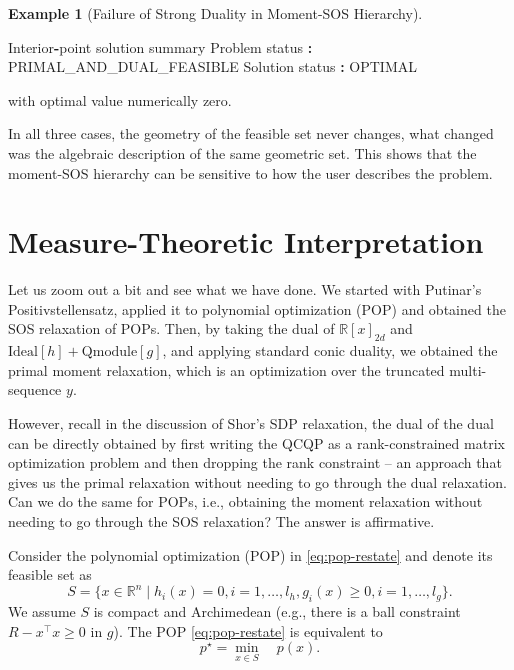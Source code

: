 \documentclass[
]{book}
\newenvironment{Shaded}{\begin{snugshade}}{\end{snugshade}}
\newcommand{\OperatorTok}[1]{\textcolor[rgb]{0.81,0.36,0.00}{\textbf{#1}}}
\newcommand{\VariableTok}[1]{\textcolor[rgb]{0.00,0.00,0.00}{#1}}
\theoremstyle{definition}
\theoremstyle{definition}
\newtheorem{example}{Example}[chapter]
\theoremstyle{definition}
\theoremstyle{definition}
\theoremstyle{remark}
\begin{document}
\begin{example}[Failure of Strong Duality in Moment-SOS Hierarchy]
\begin{Shaded}
\begin{Highlighting}[]
\VariableTok{Interior}\OperatorTok{{-}}\VariableTok{point} \VariableTok{solution} \VariableTok{summary}
  \VariableTok{Problem} \VariableTok{status}  \OperatorTok{:} \VariableTok{PRIMAL\_AND\_DUAL\_FEASIBLE}
  \VariableTok{Solution} \VariableTok{status} \OperatorTok{:} \VariableTok{OPTIMAL}
\end{Highlighting}
\end{Shaded}

with optimal value numerically zero.

In all three cases, the geometry of the feasible set never changes, what changed was the algebraic description of the same geometric set. This shows that the moment-SOS hierarchy can be sensitive to how the user describes the problem.
\end{example}

\section{Measure-Theoretic Interpretation}\label{measure-theoretic-interpretation}

Let us zoom out a bit and see what we have done. We started with Putinar's Positivstellensatz, applied it to polynomial optimization (POP) and obtained the SOS relaxation of POPs. Then, by taking the dual of \(\mathbb{R}[x]_{2d}\) and \(\mathrm{Ideal}[h] + \mathrm{Qmodule}[g]\), and applying standard conic duality, we obtained the primal moment relaxation, which is an optimization over the truncated multi-sequence \(y\).

However, recall in the discussion of Shor's SDP relaxation, the dual of the dual can be directly obtained by first writing the QCQP as a rank-constrained matrix optimization problem and then dropping the rank constraint -- an approach that gives us the primal relaxation without needing to go through the dual relaxation. Can we do the same for POPs, i.e., obtaining the moment relaxation without needing to go through the SOS relaxation? The answer is affirmative.

Consider the polynomial optimization (POP) in \eqref{eq:pop-restate} and denote its feasible set as
\[
S = \{ x \in \mathbb{R}^{n} \mid h_i(x)=0,i=1,\dots,l_h, g_i(x)\geq 0, i=1,\dots,l_g \}.
\]
We assume \(S\) is compact and Archimedean (e.g., there is a ball constraint \(R - x^\top x \geq 0\) in \(g\)). The POP \eqref{eq:pop-restate} is equivalent to
\begin{equation}
p^\star = \min_{x \in S} \quad p(x).
\label{eq:pop-with-S}
\end{equation}
\end{document}

